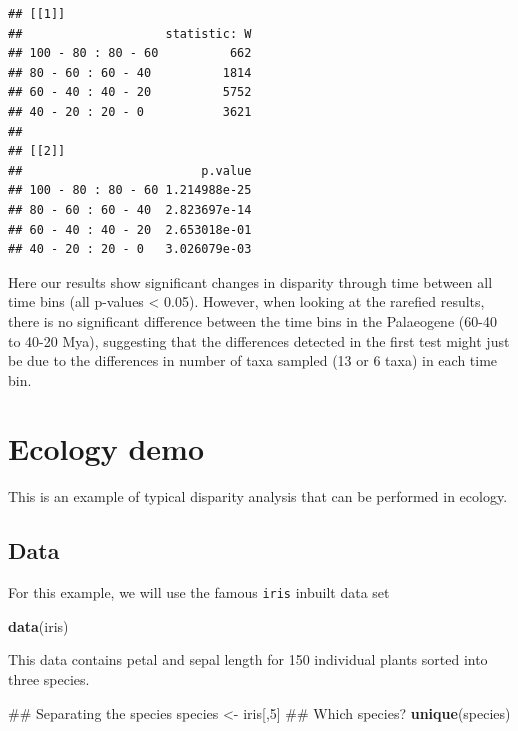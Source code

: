 \documentclass[]{book}
\newenvironment{Shaded}{\begin{snugshade}}{\end{snugshade}}
\newcommand{\KeywordTok}[1]{\textcolor[rgb]{0.13,0.29,0.53}{\textbf{#1}}}
\newcommand{\DecValTok}[1]{\textcolor[rgb]{0.00,0.00,0.81}{#1}}
\newcommand{\StringTok}[1]{\textcolor[rgb]{0.31,0.60,0.02}{#1}}
\newcommand{\NormalTok}[1]{#1}
\theoremstyle{definition}
\theoremstyle{definition}
\theoremstyle{definition}
\theoremstyle{remark}
\begin{document}
\begin{verbatim}
## [[1]]
##                    statistic: W
## 100 - 80 : 80 - 60          662
## 80 - 60 : 60 - 40          1814
## 60 - 40 : 40 - 20          5752
## 40 - 20 : 20 - 0           3621
## 
## [[2]]
##                         p.value
## 100 - 80 : 80 - 60 1.214988e-25
## 80 - 60 : 60 - 40  2.823697e-14
## 60 - 40 : 40 - 20  2.653018e-01
## 40 - 20 : 20 - 0   3.026079e-03
\end{verbatim}

Here our results show significant changes in disparity through time
between all time bins (all p-values \textless{} 0.05). However, when
looking at the rarefied results, there is no significant difference
between the time bins in the Palaeogene (60-40 to 40-20 Mya), suggesting
that the differences detected in the first test might just be due to the
differences in number of taxa sampled (13 or 6 taxa) in each time bin.

\chapter{Ecology demo}\label{ecology-demo}

This is an example of typical disparity analysis that can be performed
in ecology.

\section{Data}\label{data}

For this example, we will use the famous \texttt{iris} inbuilt data set

\begin{Shaded}
\begin{Highlighting}[]
\KeywordTok{data}\NormalTok{(iris)}
\end{Highlighting}
\end{Shaded}

This data contains petal and sepal length for 150 individual plants
sorted into three species.

\begin{Shaded}
\begin{Highlighting}[]
\NormalTok{## Separating the species}
\NormalTok{species <-}\StringTok{ }\NormalTok{iris[,}\DecValTok{5}\NormalTok{]}
\NormalTok{## Which species?}
\KeywordTok{unique}\NormalTok{(species)}
\end{Highlighting}
\end{Shaded}
\end{document}
